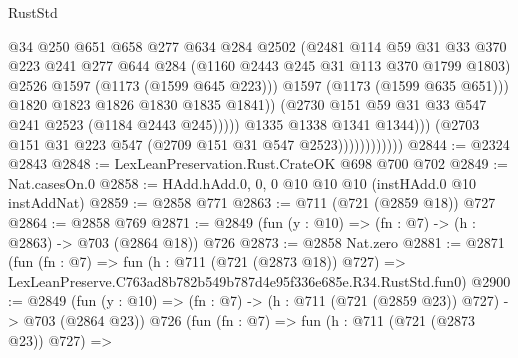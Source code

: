 \begin{lexlean}{RustStd}
\begin{coremodule}
                                          @34
                                          @250
                                          @651
                                          @658
                                          @277
                                          @634
                                          @284
                                          @2502
                                          (@2481
                                            @114
                                            @59
                                            @31
                                            @33
                                            @370
                                            @223
                                            @241
                                            @277
                                            @644
                                            @284
                                            (@1160 @2443 @245 @31 @113 @370 @1799 @1803)
                                            @2526
                                            @1597
                                            (@1173 (@1599 @645 @223)))
                                          @1597
                                          (@1173 (@1599 @635 @651)))
                                        @1820
                                        @1823
                                        @1826
                                        @1830
                                        @1835
                                        @1841))
                                    (@2730 @151 @59 @31 @33 @547 @241 @2523 (@1184 @2443 @245)))))
                              @1335
                              @1338
                              @1341
                              @1344)))
                        (@2703 @151 @31 @223 @547 (@2709 @151 @31 @547 @2523))))))))))))
@2844 := @2324 @2843
@2848 := LexLeanPreservation.Rust.CrateOK @698 @700 @702
@2849 := Nat.casesOn.{0}
@2858 := HAdd.hAdd.{0, 0, 0} @10 @10 @10 (instHAdd.{0} @10 instAddNat)
@2859 := @2858 @771
@2863 := @711 (@721 (@2859 @18)) @727
@2864 := @2858 @769
@2871 := @2849 (fun (y : @10) => (fn : @7) -> (h : @2863) -> @703 (@2864 @18)) @726
@2873 := @2858 Nat.zero
@2881 := @2871
    (fun (fn : @7) =>
    fun (h : @711 (@721 (@2873 @18)) @727) =>
    LexLeanPreserve.C763ad8b782b549b787d4e95f336e685e.R34.RustStd.fun0)
@2900 := @2849
    (fun (y : @10) => (fn : @7) -> (h : @711 (@721 (@2859 @23)) @727) -> @703 (@2864 @23))
    @726
    (fun (fn : @7) =>
    fun (h : @711 (@721 (@2873 @23)) @727) =>

\end{coremodule}
\end{lexlean}
